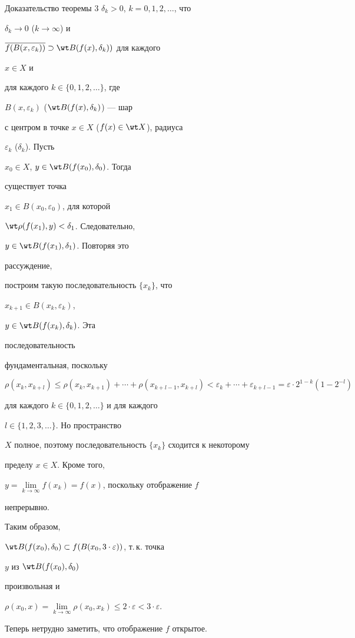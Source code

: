 \begin{pf*}{Доказательство теоремы 3}
$\delta_k>0$, $k=0,1,2,\dotsc$, что 


$\delta_k\to 0$ ($k\to\infty$) и 


$\ovl{f(B(x,\varepsilon_k))}\supset\wt B(f(x),\delta_k))$ для каждого 


$x\in X$ и 


для каждого $k\in\{0,1,2,\dotsc\}$, где 


$B(x,\varepsilon_k)$ ($\wt B(f(x),\delta_k)$) --- шар 


с центром в точке $x\in X$ ($f(x)\in\wt X$), радиуса 


$\varepsilon_k$ ($\delta_k$). Пусть 


$x_0\in X$, $y\in\wt B(f(x_0),\delta_0)$. Тогда 


существует точка 


$x_1\in B(x_0,\varepsilon_0)$, для которой 


$\wt\rho(f(x_1),y)<\delta_1$. Следовательно, 


$y\in\wt B(f(x_1),\delta_1)$. Повторяя это 


рассуждение, 


построим такую последовательность $\{x_k\}$, что 


$x_{k+1}\in B(x_k,\varepsilon_k)$, 


$y\in\wt B(f(x_k),\delta_k)$. Эта 


последовательность 


фундаментальная, поскольку 


$$ 


\rho(x_k,x_{k+l})\le\rho(x_k,x_{k+1})+\dotsb+ 


\rho(x_{k+l-1},x_{k+l})< 


\varepsilon_k+\dotsb+\varepsilon_{k+l-1}= 


\varepsilon\cdot 2^{1-k}(1-2^{-l}) 


$$ 


для каждого $k\in\{0,1,2,\dotsc\}$ и для каждого 


$l\in\{1,2,3,\dotsc\}$. Но пространство 


$X$ полное, поэтому последовательность $\{x_k\}$ сходится к некоторому 


пределу $x\in X$. Кроме того, 


$y=\lim\limits_{k\to\infty}f(x_k)=f(x)$, поскольку отображение $f$ 


непрерывно. 


Таким образом, 


$\wt B(f(x_0),\delta_0)\subset f(B(x_0,3\cdot\varepsilon))$, т.\,к. точка 


$y$ из $\wt B(f(x_0),\delta_0)$ 


произвольная и 


$\rho(x_0,x)=\lim\limits_{k\to\infty} 


\rho(x_0,x_k)\le 2\cdot\varepsilon<3\cdot\varepsilon$. 


Теперь нетрудно заметить, что отображение $f$ открытое. 


\end{pf*} 


